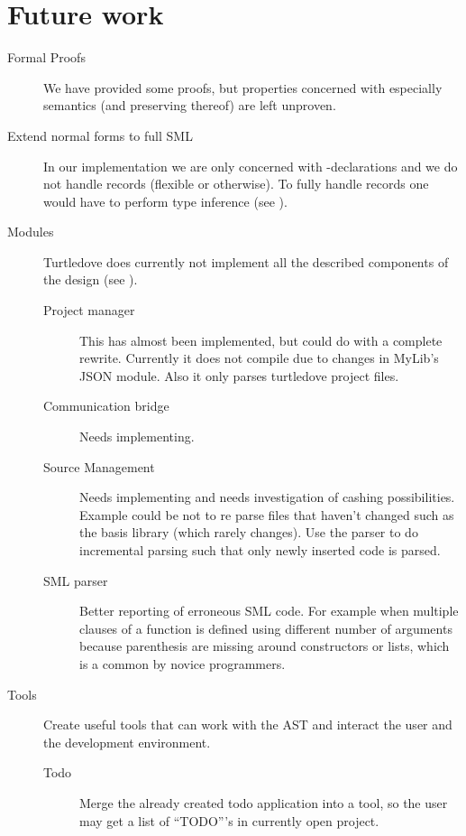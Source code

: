 \section{Future work}

\begin{description}
\item[Formal Proofs] We have provided some proofs, but properties concerned with
  especially semantics (and preserving thereof) are left unproven.

\item[Extend normal forms to full SML] In our implementation we are only concerned
  with -declarations and we do not handle records (flexible or
  otherwise). To fully handle records one would have to perform type inference
  (see ).

\item[Modules] Turtledove does currently not implement all the described
  components of the design (see ). 
  \begin{description}
  \item[Project manager] This has almost been implemented, but could do with a
    complete rewrite. Currently it does not compile due to changes in MyLib's
    JSON module. Also it only parses turtledove project files.

  \item[Communication bridge] Needs implementing.

  \item[Source Management] Needs implementing and needs investigation of cashing
    possibilities. Example could be not to re parse files that haven't changed
    such as the basis library (which rarely changes). Use the parser to do
    incremental parsing such that only newly inserted code is parsed.

  \item[SML parser] Better reporting of erroneous SML code. For example when
    multiple clauses of a function is defined using different number of
    arguments because parenthesis are missing around constructors or lists,
    which is a common by novice programmers.
  \end{description}

\item[Tools] Create useful tools that can work with the AST and interact the
  user and the development environment.

  \begin{description}
  \item[Todo] Merge the already created todo application into a tool, so the
    user may get a list of ``TODO'''s in currently open project.


\end{description}
\end{description}
